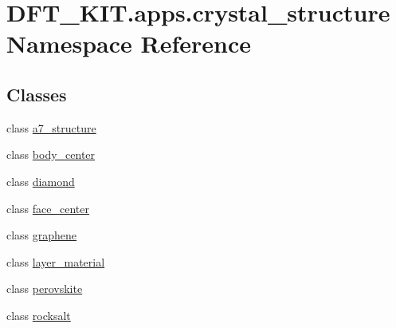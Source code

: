 \hypertarget{namespace_d_f_t___k_i_t_1_1apps_1_1crystal__structure}{\section{D\+F\+T\+\_\+\+K\+I\+T.\+apps.\+crystal\+\_\+structure Namespace Reference}
\label{namespace_d_f_t___k_i_t_1_1apps_1_1crystal__structure}
}
\subsection*{Classes}
\begin{DoxyCompactItemize}
\item 
class \hyperlink{class_d_f_t___k_i_t_1_1apps_1_1crystal__structure_1_1a7__structure}{a7\+\_\+structure}
\item 
class \hyperlink{class_d_f_t___k_i_t_1_1apps_1_1crystal__structure_1_1body__center}{body\+\_\+center}
\item 
class \hyperlink{class_d_f_t___k_i_t_1_1apps_1_1crystal__structure_1_1diamond}{diamond}
\item 
class \hyperlink{class_d_f_t___k_i_t_1_1apps_1_1crystal__structure_1_1face__center}{face\+\_\+center}
\item 
class \hyperlink{class_d_f_t___k_i_t_1_1apps_1_1crystal__structure_1_1graphene}{graphene}
\item 
class \hyperlink{class_d_f_t___k_i_t_1_1apps_1_1crystal__structure_1_1layer__material}{layer\+\_\+material}
\item 
class \hyperlink{class_d_f_t___k_i_t_1_1apps_1_1crystal__structure_1_1perovskite}{perovskite}
\item 
class \hyperlink{class_d_f_t___k_i_t_1_1apps_1_1crystal__structure_1_1rocksalt}{rocksalt}
\end{DoxyCompactItemize}
